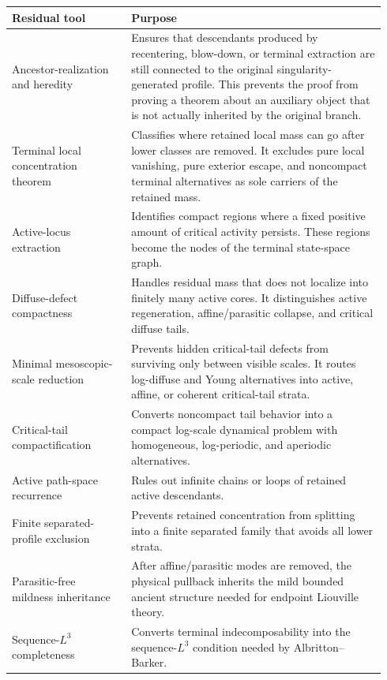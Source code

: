 \documentclass[11pt]{amsart}
\begin{document}
\begin{longtable}{@{}>{\raggedright\arraybackslash}p{0.30\linewidth}>{\raggedright\arraybackslash}p{0.64\linewidth}@{}}
\toprule
\textbf{Residual tool} & \textbf{Purpose} \\
\midrule
\endhead
Ancestor-realization and heredity & Ensures that descendants produced by recentering, blow-down, or terminal extraction are still connected to the original singularity-generated profile. This prevents the proof from proving a theorem about an auxiliary object that is not actually inherited by the original branch. \\
Terminal local concentration theorem & Classifies where retained local mass can go after lower classes are removed. It excludes pure local vanishing, pure exterior escape, and noncompact terminal alternatives as sole carriers of the retained mass. \\
Active-locus extraction & Identifies compact regions where a fixed positive amount of critical activity persists. These regions become the nodes of the terminal state-space graph. \\
Diffuse-defect compactness & Handles residual mass that does not localize into finitely many active cores. It distinguishes active regeneration, affine/parasitic collapse, and critical diffuse tails. \\
Minimal mesoscopic-scale reduction & Prevents hidden critical-tail defects from surviving only between visible scales. It routes log-diffuse and Young alternatives into active, affine, or coherent critical-tail strata. \\
Critical-tail compactification & Converts noncompact tail behavior into a compact log-scale dynamical problem with homogeneous, log-periodic, and aperiodic alternatives. \\
Active path-space recurrence & Rules out infinite chains or loops of retained active descendants. \\
Finite separated-profile exclusion & Prevents retained concentration from splitting into a finite separated family that avoids all lower strata. \\
Parasitic-free mildness inheritance & After affine/parasitic modes are removed, the physical pullback inherits the mild bounded ancient structure needed for endpoint Liouville theory. \\
Sequence-\(L^3\) completeness & Converts terminal indecomposability into the sequence-\(L^3\) condition needed by Albritton--Barker. \\
\bottomrule
\end{longtable}
\end{document}
